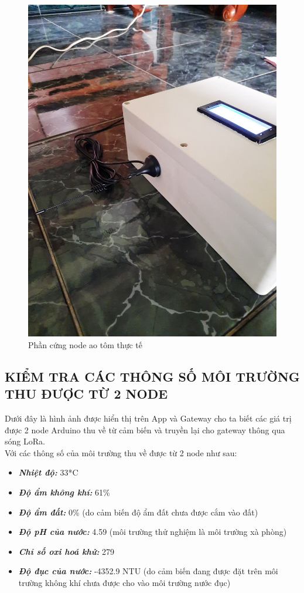 \begin{figure}[H]
	\centering
	\includegraphics[scale=0.1]{Chapter 4/image chapter 4/antenAotom.jpg}
	\caption[Phần cứng node ao tôm thực tế]{Phần cứng node ao tôm thực tế}
\end{figure}
\subsection{KIỂM TRA CÁC THÔNG SỐ MÔI TRƯỜNG THU ĐƯỢC TỪ 2 NODE}
Dưới đây là hình ảnh được hiển thị trên App và Gateway cho ta biết các giá trị được 2 node Arduino thu về từ cảm biến và truyền lại cho gateway thông qua sóng LoRa.\\
\indent Với các thông số của môi trường thu về được từ 2 node như sau:
\begin{itemize}
	\item \textbf{\textit{Nhiệt độ: }} 33*C
	\item \textbf{\textit{Độ ẩm không khí: }} 61\%
	\item \textbf{\textit{Độ ẩm đất: }} 0\% (do cảm biến độ ẩm đất chưa được cắm vào đất)
	\item \textbf{\textit{Độ pH của nước: }} 4.59 (môi trường thử nghiệm là môi trường xà phòng)
	\item \textbf{\textit{Chỉ số oxi hoá khử: }} 279
	\item \textbf{\textit{Độ đục của nước: }} -4352.9 NTU (do cảm biến đang được đặt trên môi trường không khí chưa được cho vào môi trường nước đục)
\end{itemize}

